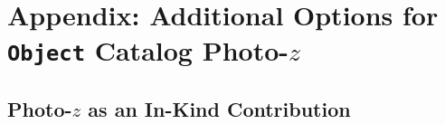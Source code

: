 \documentclass[DM,lsstdraft,toc]{lsstdoc}
\begin{document}

\clearpage
\section{Appendix: Additional Options for {\tt Object} Catalog Photo-$z$}\label{sec:opts}

\subsection{Photo-$z$ as an In-Kind Contribution}\label{ssec:opts_inkind}
\end{document}
